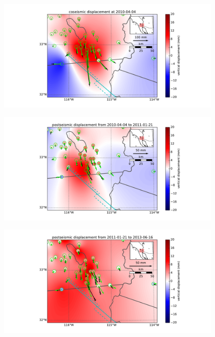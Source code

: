 \documentclass[12pt]{article}
\begin{document}
\begin{figure}
\includegraphics[scale=0.6]{Figures/near_field_data_1}
\centering 
\caption{}
\label{fig:NearField1}
\end{figure}
\begin{figure}
\includegraphics[scale=0.6]{Figures/near_field_data_2}
\centering 
\caption{}
\label{fig:NearField2}
\end{figure}
\begin{figure}
\includegraphics[scale=0.6]{Figures/near_field_data_3}
\centering 
\caption{}
\label{fig:NearField3}
\end{figure}
\end{document}
